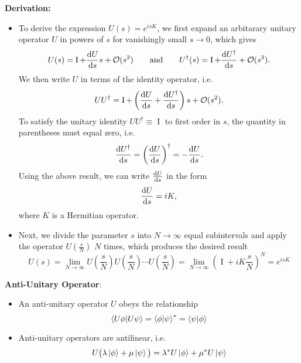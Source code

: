\documentclass[11pt, a4paper]{article}
\newcommand{\Herm}{Hermitian\xspace}
\newcommand{\II}{\operatorname{I}}  %
\begin{document}
\textbf{Derivation:}
\begin{itemize}
    \item To derive the expression $ U(s) = e^{isK} $, we first expand an arbitarary unitary operator $ U $ in powers of $ s $ for vanishingly small $ s \to 0 $, which gives
    \begin{equation*}
        U(s) = \II + \dv{U}{s}s + \mathcal{O}(s^{2}) \qquad \text{and} \qquad U^{\dagger}(s) = \II + \dv{U^{\dagger}}{s} + \mathcal{O}(s^{2}).
    \end{equation*}
    We then write $ U $ in terms of the identity operator, i.e.
    \begin{equation*}
        UU^{\dagger} = \II + \left( \dv{U}{s} + \dv{U^{\dagger}}{s} \right)s + \mathcal{O}(s^{2}).
    \end{equation*}
    To satisfy the unitary identity $ UU^{\dagger} \equiv \II $ to first order in $ s $, the quantity in parentheses must equal zero, i.e.
    \begin{equation*}
        \dv{U^{\dagger}}{s} = \left( \dv{U}{s} \right)^{\dagger} = -\dv{U}{s}.
    \end{equation*}
    Using the above result, we can write $ \dv{U}{s} $ in the form
    \begin{equation*}
        \dv{U}{s} = i K,
    \end{equation*}
    where $ K $ is a \Herm operator.

    \item Next, we divide the parameter $ s $ into $ N \to \infty $ equal subintervals and apply the operator $ U(\tfrac{s}{N}) $ $ N $ times, which produces the desired result
    \begin{equation*}
        U(s) = \lim_{N \to \infty} U \left(\frac{s}{N}\right) U\left(\frac{s}{N}\right) \cdots U\left(\frac{s}{N}\right) = \lim_{N \to \infty} \left( \II + i K \frac{s}{N} \right)^{N} = e^{isK}
    \end{equation*}
    
\end{itemize}
    
\textbf{Anti-Unitary Operator}: 
\begin{itemize}
	\item An anti-unitary operator $ U $ obeys the relationship
	\begin{equation*}
		\braket{U\phi}{U\psi} = \braket{\phi}{\psi}^{*}= \braket{\psi}{\phi}
	\end{equation*}
	
	\item Anti-unitary operators are antilinear, i.e.
	\begin{equation*}
		U\big(\lambda \ket{\phi} + \mu \ket{\psi}\big) = \lambda^{*}U\ket{\phi} + \mu^{*}U\ket{\psi}
	\end{equation*}

\end{itemize}
\end{document}
